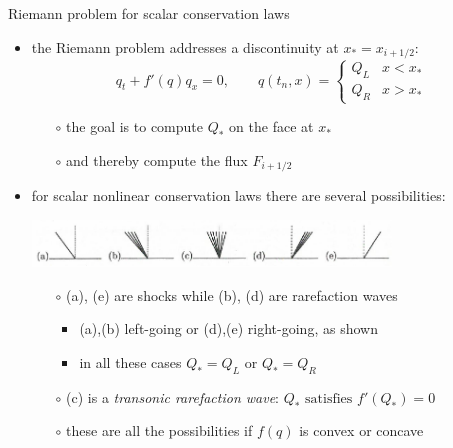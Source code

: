 \documentclass[10pt,hyperref,dvipsnames]{beamer}
\begin{document}
\begin{frame}{Riemann problem for scalar conservation laws}

\begin{itemize}
\item the Riemann problem addresses a discontinuity at $x_*=x_{i+1/2}$:
    $$q_t + f'(q)q_x = 0, \qquad q(t_n,x) = \begin{cases} Q_L & x < x_* \\ Q_R & x > x_* \end{cases}$$

    \begin{itemize}
    \item[$\circ$] the goal is to compute $Q_*$ on the face at $x_*$
    \item[$\circ$] and thereby compute the flux $F_{i+1/2}$
    \end{itemize}
\item for scalar nonlinear conservation laws there are several possibilities:

\begin{center}
\includegraphics[width=0.75\textwidth]{figs/leveque12p1}
\end{center}

    \begin{itemize}
    \item[$\circ$] (a), (e) are shocks while (b), (d) are rarefaction waves
        \begin{itemize}
        \item (a),(b) left-going or (d),(e) right-going, as shown
        \item in all these cases $Q_*=Q_L$ or $Q_*=Q_R$
        \end{itemize}
    \item[$\circ$] (c) is a \emph{transonic rarefaction wave}: $Q_* \text{ satisfies } f'(Q_*)=0$
    \item[$\circ$] these are all the possibilities if $f(q)$ is convex or concave
    \end{itemize}
\end{itemize}
\end{frame}
\end{document}
